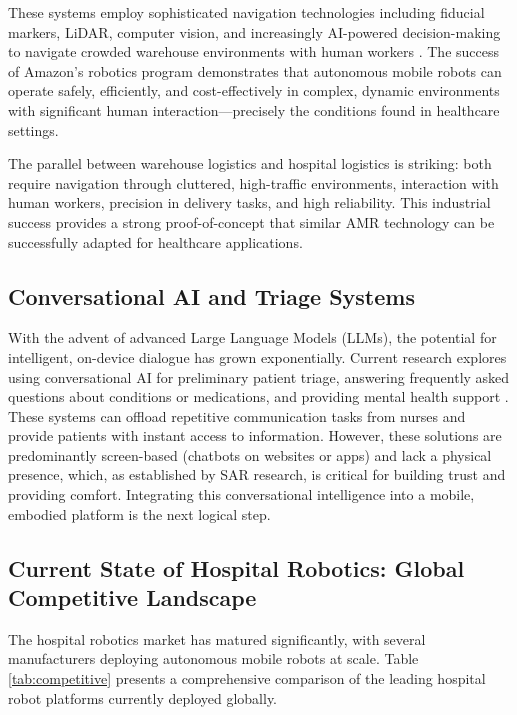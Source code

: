 \documentclass[11pt,a4paper]{article}
\begin{document}
These systems employ sophisticated navigation technologies including fiducial markers, LiDAR, computer vision, and increasingly AI-powered decision-making to navigate crowded warehouse environments with human workers \cite{amazon2024ai}. The success of Amazon's robotics program demonstrates that autonomous mobile robots can operate safely, efficiently, and cost-effectively in complex, dynamic environments with significant human interaction—precisely the conditions found in healthcare settings.

The parallel between warehouse logistics and hospital logistics is striking: both require navigation through cluttered, high-traffic environments, interaction with human workers, precision in delivery tasks, and high reliability. This industrial success provides a strong proof-of-concept that similar AMR technology can be successfully adapted for healthcare applications.

\subsection{Conversational AI and Triage Systems}

With the advent of advanced Large Language Models (LLMs), the potential for intelligent, on-device dialogue has grown exponentially. Current research explores using conversational AI for preliminary patient triage, answering frequently asked questions about conditions or medications, and providing mental health support \cite{laranjo2018}. These systems can offload repetitive communication tasks from nurses and provide patients with instant access to information. However, these solutions are predominantly screen-based (chatbots on websites or apps) and lack a physical presence, which, as established by SAR research, is critical for building trust and providing comfort. Integrating this conversational intelligence into a mobile, embodied platform is the next logical step.

\subsection{Current State of Hospital Robotics: Global Competitive Landscape}

The hospital robotics market has matured significantly, with several manufacturers deploying autonomous mobile robots at scale. Table \ref{tab:competitive} presents a comprehensive comparison of the leading hospital robot platforms currently deployed globally.
\end{document}
